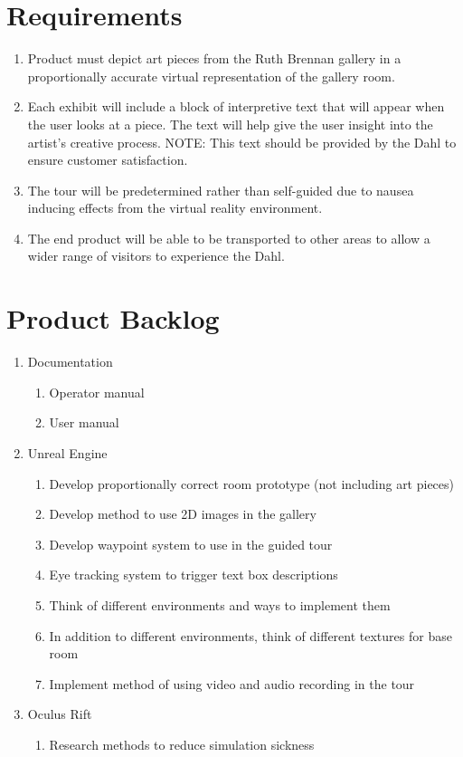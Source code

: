 \documentclass[11pt]{article}
\begin{document}
\section{Requirements}

\begin{enumerate}
\item Product must depict art pieces from the Ruth Brennan gallery in a proportionally accurate virtual representation of the gallery room.

\item Each exhibit will include a block of interpretive text that will appear when the user looks at a piece.  The text will help give the user insight into the artist's creative process. NOTE:  This text should be provided by the Dahl to ensure customer satisfaction.

\item The tour will be predetermined rather than self-guided due to nausea inducing effects from the virtual reality environment.

\item The end product will be able to be transported to other areas to allow a wider range of visitors to experience the Dahl.
\end{enumerate}

\section{Product Backlog}
\begin{enumerate}
\item Documentation
	\begin{enumerate}
	\item Operator manual
	\item User manual
	\end{enumerate}
\item Unreal Engine
	\begin{enumerate}
	\item Develop proportionally correct room prototype (not including art pieces)
	\item Develop method to use 2D images in the gallery
	\item Develop waypoint system to use in the guided tour
	\item Eye tracking system to trigger text box descriptions
	\item Think of different environments and ways to implement them
	\item In addition to different environments, think of different textures for base room
	\item Implement method of using video and audio recording in the tour
	\end{enumerate}
\item Oculus Rift
	\begin{enumerate}
	\item Research methods to reduce simulation sickness
	\end{enumerate}
\end{enumerate}
\end{document}
